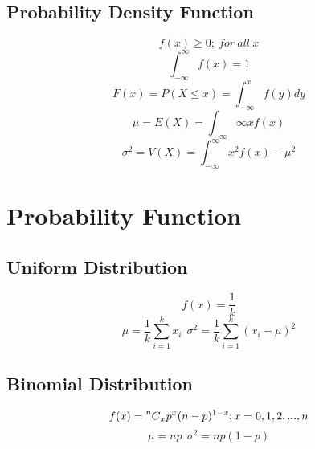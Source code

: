 \documentclass[twocolumn]{article}
\newcommand\Comb[2][^n]{\prescript{#1\mkern-0.5mu}{}C_{#2}}
\begin{document}
\subsection{Probability Density Function}
\begin{equation}
    f(x) \geq 0;\ for\ all\ x
\end{equation}
\begin{equation}
    \int_{-\infty}^{\infty} f(x) = 1
\end{equation}
\begin{equation}
    F(x) = P(X \leq x) = \int_{-\infty}^{x} f(y)dy
\end{equation}
\begin{equation}
    \mu = E(X) = \int_{-\infty}{\infty} xf(x)
\end{equation}
\begin{equation}
    \sigma^{2} = V(X) = \int_{-\infty}^{\infty} x^{2}f(x) - \mu^{2}
\end{equation}

\section{Probability Function}
\subsection{Uniform Distribution}
\begin{equation}
    f(x) = \frac{1}{k}
\end{equation}
\begin{equation}
    \mu = \frac{1}{k} \sum_{i=1}^{k} x_{i}\ \ 
    \sigma^{2} = \frac{1}{k} \sum_{i=1}^{k} (x_{i}-\mu)^{2}
\end{equation}
\subsection{Binomial Distribution}
\begin{equation}
    f(x) = \Comb[n]{x} p^{x}(n-p)^{1-x}; x = 0,1,2,...,n
\end{equation}
\begin{equation}
    \mu = np\ \ 
    \sigma^{2} = np(1-p)
\end{equation}
\end{document}
